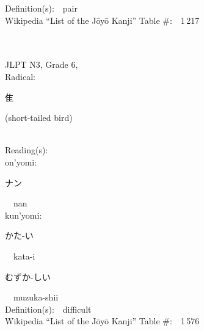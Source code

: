 \begin{multicols}{2}
Definition(s):\ \ pair \\
Wikipedia ``List of the J\=oy\=o Kanji'' Table \#:\ \ 1\,217 \\
\ \ \\
{\fontsize{34pt}{40pt}  }\ \ \\  %
{JLPT N3, Grade 6, \\Radical:\ \ {\begin{CJK}{UTF8}{min} 隹 \end{CJK}} (short-tailed bird) } \\
Reading(s):\ \ \\
{\hspace*{1em}}on'yomi:\ \ \\
{\hspace*{2em}}{\begin{CJK}{UTF8}{min} ナン \end{CJK}}\ \ nan\ \ \\
{\hspace*{1em}}kun'yomi:\ \ \\
{\hspace*{2em}}{\begin{CJK}{UTF8}{min} かた-い \end{CJK}}\ \ kata-i\ \ \\
{\hspace*{2em}}{\begin{CJK}{UTF8}{min} むずか-しい \end{CJK}}\ \ muzuka-shii\ \ \\
Definition(s):\ \ difficult \\
Wikipedia ``List of the J\=oy\=o Kanji'' Table \#:\ \ 1\,576 \\
\ \ \\
\end{multicols}



